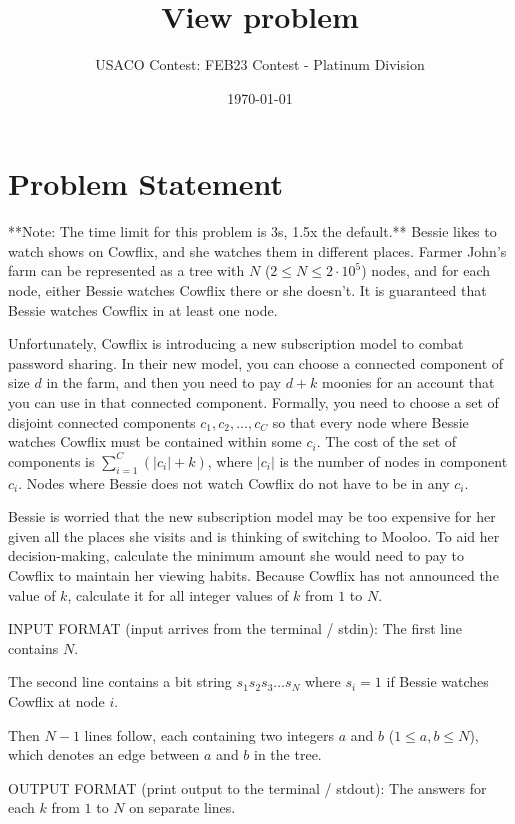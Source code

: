 \documentclass[12pt]{article}
\title{View problem}
\author{USACO Contest: FEB23 Contest - Platinum Division}
\date{\today}
\begin{document}
\maketitle

\section*{Problem Statement}


**Note: The time limit for this problem is 3s, 1.5x the default.**
Bessie likes to watch shows on Cowflix, and she watches them in different
places. Farmer John's farm can be represented as a tree with $N$
($2 \leq N \leq 2\cdot 10^5$) nodes, and for each node, either Bessie watches
Cowflix there or she doesn't. It is guaranteed that Bessie watches Cowflix  in
at least one node.

Unfortunately, Cowflix is introducing a new subscription model to combat
password sharing. In their new model, you can choose a connected component of
size $d$ in the farm, and then you need to pay $d + k$ moonies for an account
that you can use in that connected component. Formally, you need to choose a set
of disjoint connected components $c_1, c_2, \dots, c_C$ so that every node where
Bessie watches Cowflix must be contained within some $c_i$.  The cost of the set
of components is $\sum_{i=1}^{C} (|c_i|+k)$, where $|c_i|$ is the number of
nodes in component $c_i$. Nodes where Bessie does not watch Cowflix do not have
to be in any $c_i$.

Bessie is worried that the new subscription model may be too expensive for her
given all the places she visits and is thinking of switching to Mooloo. To aid
her decision-making, calculate the minimum amount she would need to pay to
Cowflix to maintain her viewing habits. Because Cowflix has not announced the
value of $k$, calculate it for all integer values of $k$ from $1$ to $N$.

INPUT FORMAT (input arrives from the terminal / stdin):
The first line contains $N$. 

The second line contains a bit string $s_1s_2s_3 \dots s_N$ where $s_i = 1$ if
Bessie watches Cowflix at node $i$. 

Then $N-1$ lines follow, each containing two integers $a$ and $b$
($1 \leq a, b \leq N$), which denotes an edge between $a$ and $b$ in the tree.

OUTPUT FORMAT (print output to the terminal / stdout):
The answers for each $k$ from $1$ to $N$ on separate lines.
\end{document}
